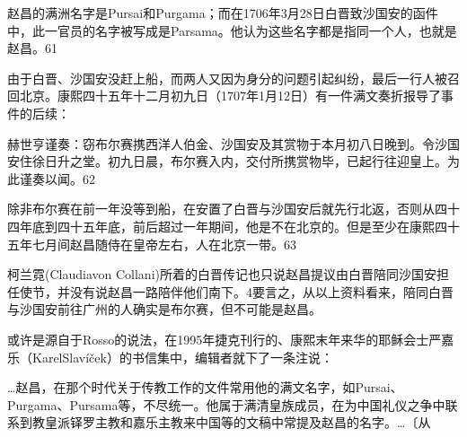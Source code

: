 \vfill
\begin{BookNotes}
\end{BookNotes}

\noindent 赵昌的满洲名字是Pursai和Purgama；而在1706年3月28日白晋致沙国安的函件中，此一官员的名字被写成是Parsama。他认为这些名字都是指同一个人，也就是赵昌。61

由于白晋、沙国安没赶上船，而两人又因为身分的问题引起纠纷，最后一行人被召回北京。康熙四十五年十二月初九日（1707年1月12日）有一件满文奏折报导了事件的后续：

\begin{BookQuote}
赫世亨谨奏：窃布尔赛携西洋人伯金、沙国安及其赏物于本月初八日晚到。令沙国安住徐日升之堂。初九日晨，布尔赛入内，交付所携赏物毕，已起行往迎皇上。为此谨奏以闻。62
\end{BookQuote}

除非布尔赛在前一年没等到船，在安置了白晋与沙国安后就先行北返，否则从四十四年底到四十五年底，前后超过一年期间，他是不在北京的。但是至少在康熙四十五年七月间赵昌随侍在皇帝左右，人在北京一带。63

柯兰霓(Claudiavon Collani)所着的白晋传记也只说赵昌提议由白晋陪同沙国安担任使节，并没有说赵昌一路陪伴他们南下。4要言之，从以上资料看来，陪同白晋与沙国安前往广州的人确实是布尔赛，但不可能是赵昌。

或许是源自于Rosso的说法，在1995年捷克刊行的、康熙末年来华的耶稣会士严嘉乐（KarelSlavíček）的书信集中，编辑者就下了一条注说：

\begin{BookQuote}
…赵昌，在那个时代关于传教工作的文件常用他的满文名字，如Pursai、Purgama、Pursama等，不尽统一。他属于满清皇族成员，在为中国礼仪之争中联系到教皇派铎罗主教和嘉乐主教来中国等的文稿中常提及赵昌的名字。…〔从
\end{BookQuote}

